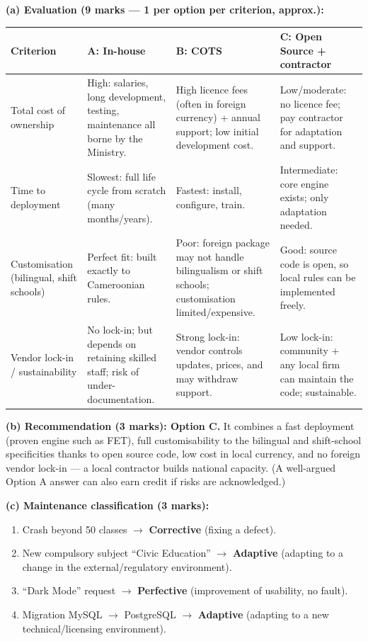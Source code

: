 \documentclass[11pt]{article}
\begin{document}
\begin{corrige}
\textbf{(a) Evaluation (9 marks — 1 per option per criterion, approx.):}
\begin{center}
\begin{tabularx}{\linewidth}{|l|X|X|X|}\hline
\rowcolor{popblueL} \textbf{Criterion} & \textbf{A: In-house} & \textbf{B: COTS} & \textbf{C: Open Source + contractor} \\ \hline
Total cost of ownership & High: salaries, long development, testing, maintenance all borne by the Ministry. & High licence fees (often in foreign currency) + annual support; low initial development cost. & Low/moderate: no licence fee; pay contractor for adaptation and support. \\ \hline
Time to deployment & Slowest: full life cycle from scratch (many months/years). & Fastest: install, configure, train. & Intermediate: core engine exists; only adaptation needed. \\ \hline
Customisation (bilingual, shift schools) & Perfect fit: built exactly to Cameroonian rules. & Poor: foreign package may not handle bilingualism or shift schools; customisation limited/expensive. & Good: source code is open, so local rules can be implemented freely. \\ \hline
Vendor lock-in / sustainability & No lock-in; but depends on retaining skilled staff; risk of under-documentation. & Strong lock-in: vendor controls updates, prices, and may withdraw support. & Low lock-in: community + any local firm can maintain the code; sustainable. \\ \hline
\end{tabularx}
\end{center}

\textbf{(b) Recommendation (3 marks): Option C.} It combines a fast deployment (proven engine such as FET), full customisability to the bilingual and shift-school specificities thanks to open source code, low cost in local currency, and no foreign vendor lock-in — a local contractor builds national capacity. (A well-argued Option A answer can also earn credit if risks are acknowledged.)

\textbf{(c) Maintenance classification (3 marks):}
\begin{enumerate}
    \item Crash beyond 50 classes $\rightarrow$ \textbf{Corrective} (fixing a defect).
    \item New compulsory subject ``Civic Education'' $\rightarrow$ \textbf{Adaptive} (adapting to a change in the external/regulatory environment).
    \item ``Dark Mode'' request $\rightarrow$ \textbf{Perfective} (improvement of usability, no fault).
    \item Migration MySQL $\rightarrow$ PostgreSQL $\rightarrow$ \textbf{Adaptive} (adapting to a new technical/licensing environment).
\end{enumerate}
\end{corrige}
\end{document}
